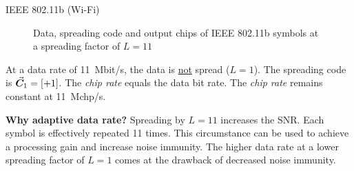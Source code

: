 \begin{refsection}
\begin{example}{\acs{IEEE} 802.11b (Wi-Fi)}
\begin{figure}[H]
{
		}
	
		\caption{Data, spreading code and output chips of IEEE 802.11b symbols at a spreading factor of $L = 11$}
		\label{fig:ch07:wlan_dsss}
	\end{figure}
	
	At a data rate of \SI{11}{Mbit/s}, the data is \underline{not} spread ($L = 1$). The spreading code is $\vec{\bm{C}}_{1} = \left[+1\right]$. The \emph{chip rate} equals the data bit rate. The \emph{chip rate} remains constant at \SI{11}{Mchp/s}.
	
	\vspace{0.5em}
	
	\textbf{Why adaptive data rate?} Spreading by $L = 11$ increases the \ac{SNR}. Each symbol is effectively repeated 11 times. This circumstance can be used to achieve a processing gain and increase noise immunity. The higher data rate at a lower spreading factor of $L = 1$ comes at the drawback of decreased noise immunity.
\end{example}


\end{refsection}
